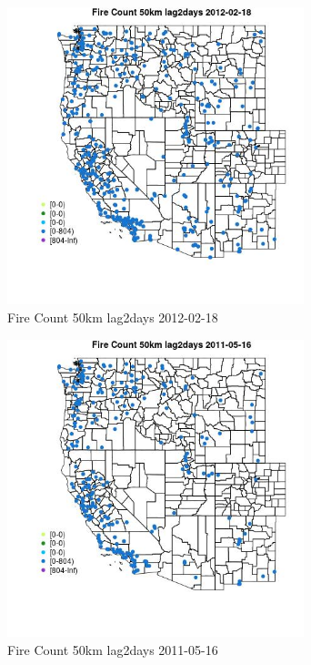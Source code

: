 \begin{figure} 
\centering  
\includegraphics[width=0.77\textwidth]{Code_Outputs/Report_ML_input_PM25_Step4_part_f_de_duplicated_aveswNAs_MapObsFire_Count_50km_lag2days2012-02-18.jpg} 
\caption{\label{fig:Report_ML_input_PM25_Step4_part_f_de_duplicated_aveswNAsMapObsFire_Count_50km_lag2days2012-02-18}Fire Count 50km lag2days 2012-02-18} 
\end{figure} 
 

\begin{figure} 
\centering  
\includegraphics[width=0.77\textwidth]{Code_Outputs/Report_ML_input_PM25_Step4_part_f_de_duplicated_aveswNAs_MapObsFire_Count_50km_lag2days2011-05-16.jpg} 
\caption{\label{fig:Report_ML_input_PM25_Step4_part_f_de_duplicated_aveswNAsMapObsFire_Count_50km_lag2days2011-05-16}Fire Count 50km lag2days 2011-05-16} 
\end{figure} 
 

